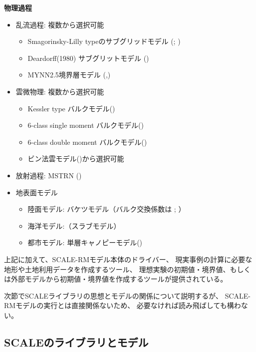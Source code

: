 {\bf 物理過程}
\begin{itemize}
 \item 乱流過程: 複数から選択可能
   \begin{itemize}
    \item Smagorinsky-Lilly typeのサブグリッドモデル (\cite{smagorinsky_1963}; \cite{lilly_1962})
    \item Deardorff(1980) サブグリットモデル (\cite{Deardorff_1980})
    \item MYNN2.5境界層モデル (\cite{my_1982},\cite{nakanishi_2004})
   \end{itemize}
 \item 雲微物理: 複数から選択可能
   \begin{itemize}
    \item Kessler type バルクモデル(\cite{kessler_1969})
    \item 6-class single moment バルクモデル(\cite{tomita_2008})
    \item 6-class double moment バルクモデル(\cite{sn_2014})
    \item ビン法雲モデル(\cite{suzuki_etal_2010})から選択可能
   \end{itemize}
 \item 放射過程: MSTRN (\cite{sekiguchi_2008})
 \item 地表面モデル
  \begin{itemize}
   \item 陸面モデル: バケツモデル（バルク交換係数は \cite{beljaars_1991}; \cite{wilson_2001}）
   \item 海洋モデル:（スラブモデル）
   \item 都市モデル: 単層キャノピーモデル(\cite{kusaka_2001})
  \end{itemize}
\end{itemize}

上記に加えて、SCALE-RMモデル本体のドライバー、
現実事例の計算に必要な地形や土地利用データを作成するツール、
理想実験の初期値・境界値、もしくは外部モデルから初期値・境界値を作成するツールが提供されている。

次節でSCALEライブラリの思想とモデルの関係について説明するが、
SCALE-RMモデルの実行とは直接関係ないため、
必要なければ読み飛ばしても構わない。


\subsection{SCALEのライブラリとモデル}

